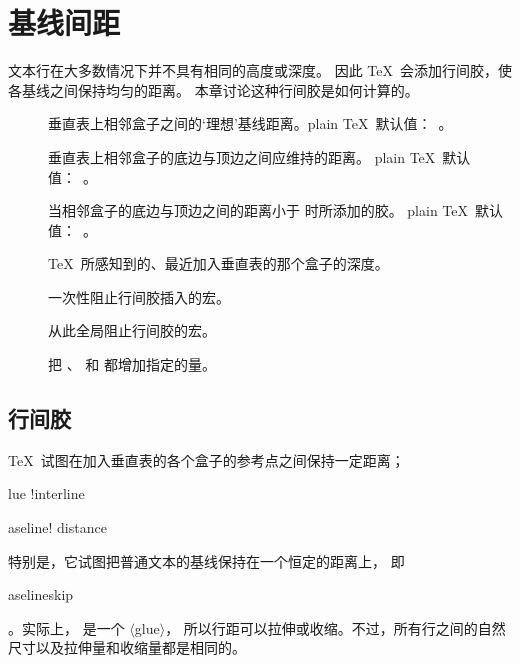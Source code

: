 \documentclass[a4paper]{rapport3}
\makeatletter
\def\gr#1{$\langle$#1$\rangle$}\def\key#1{{\tt#1}}
\newenvironment{inventory}{\begin{description}}{\end{description}}
\def\term#1\par{\index{#1}}
\def\cstoidx#1\par{\index{#1@\cs{#1}}}
\def\csidx#1{\cstoidx #1\par\cs{#1}}
\makeatother
\begin{document}
\endofchapter
\chapter{基线间距}\label{baseline}

\hbox{}\vfil\vfil\hbox{}
文本行在大多数情况下并不具有相同的高度或深度。
因此 \TeX\ 会添加行间胶，使各基线之间保持均匀的距离。
本章讨论这种行间胶是如何计算的。

\begin{inventory}

\item [] 
      垂直表上相邻盒子之间的`理想'基线距离。plain \TeX\ 默认值：~\n{12pt}。

\item [] 
      垂直表上相邻盒子的底边与顶边之间应维持的距离。
      plain \TeX\ 默认值：~\n{0pt}。

\item []  
      当相邻盒子的底边与顶边之间的距离小于  时所添加的胶。
      plain \TeX\ 默认值：~\n{1pt}。

\item []  
      \TeX\ 所感知到的、最近加入垂直表的那个盒子的深度。

\item []
      一次性阻止行间胶插入的宏。

\item []
      从此全局阻止行间胶的宏。

\item []
      把 、 和  都增加指定的量。

\end{inventory}


\hbox{}\vfil\hbox{}

\section{行间胶}

%

\TeX\ 试图在加入垂直表的各个盒子的参考点之间保持一定距离；
\term glue !interline\par\term baseline! distance\par
特别是，它试图把普通文本的基线保持在一个恒定的距离上，
即 \csidx{baselineskip}。实际上， 是一个 \gr{glue}，
所以行距可以拉伸或收缩。不过，所有行之间的自然尺寸以及拉伸量和收缩量都是相同的。
\end{document}
